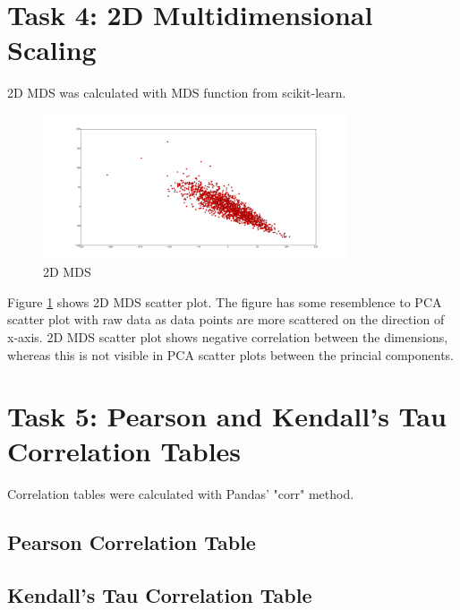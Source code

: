 \documentclass[12pt]{article}
\begin{document}
\section{Task 4: 2D Multidimensional Scaling}

2D MDS was calculated with MDS function from scikit-learn.

\begin{figure}[H]
    \centering
    \includegraphics[width=0.8\textwidth]{2d_mds}
    \caption{2D MDS}
    \label{fig:mds}
\end{figure}

Figure \ref{fig:mds} shows 2D MDS scatter plot. The figure has some resemblence to PCA scatter plot with raw data as data points are more scattered on the direction of x-axis. 2D MDS scatter plot shows negative correlation between the dimensions, whereas this is not visible in PCA scatter plots between the princial components.

\section{Task 5: Pearson and Kendall's Tau Correlation Tables}

Correlation tables were calculated with Pandas' "corr" method.

\subsection{Pearson Correlation Table}

\resizebox{\linewidth}{!}{%



}

\subsection{Kendall's Tau Correlation Table}

\resizebox{\linewidth}{!}{%



}
\end{document}
